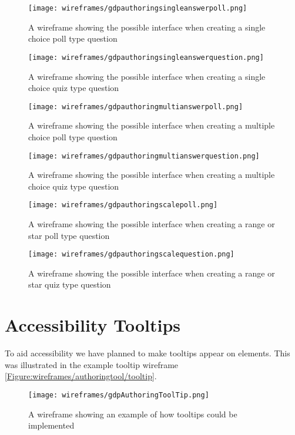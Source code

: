 \begin{figure}
	\centering
	\texttt{[image: wireframes/gdpauthoringsingleanswerpoll.png]}
	\caption{A wireframe showing the possible interface when creating a single choice poll type question}
	\label{Figure:wireframes/authoringtool/singlePoll}
\end{figure}

\begin{figure}
	\centering
	\texttt{[image: wireframes/gdpauthoringsingleanswerquestion.png]}
	\caption{A wireframe showing the possible interface when creating a single choice quiz type question}
	\label{Figure:wireframes/authoringtool/singleQuiz}
\end{figure}

\begin{figure}
	\centering
	\texttt{[image: wireframes/gdpauthoringmultianswerpoll.png]}
	\caption{A wireframe showing the possible interface when creating a multiple choice poll type question}
	\label{Figure:wireframes/authoringtool/multiPoll}
\end{figure}

\begin{figure}
	\centering
	\texttt{[image: wireframes/gdpauthoringmultianswerquestion.png]}
	\caption{A wireframe showing the possible interface when creating a multiple choice quiz type question}
	\label{Figure:wireframes/authoringtool/multiQuiz}
\end{figure}

\begin{figure}
	\centering
	\texttt{[image: wireframes/gdpauthoringscalepoll.png]}
	\caption{A wireframe showing the possible interface when creating a range or star poll type question}
	\label{Figure:wireframes/authoringtool/rangeStarPoll}
\end{figure}


\begin{figure}
	\centering
	\texttt{[image: wireframes/gdpauthoringscalequestion.png]}
	\caption{A wireframe showing the possible interface when creating a range or star quiz type question}
	\label{Figure:wireframes/authoringtool/rangeStarQuiz}
\end{figure}

\section{Accessibility Tooltips}

To aid accessibility we have planned to make tooltips appear on elements. This was illustrated in the example tooltip wireframe \autoref{Figure:wireframes/authoringtool/tooltip}.

\begin{landscape}
\begin{figure}
	\centering
	\texttt{[image: wireframes/gdpAuthoringToolTip.png]}
	\caption{A wireframe showing an example of how tooltips could be implemented}
	\label{Figure:wireframes/authoringtool/tooltip}
\end{figure}
\end{landscape}
